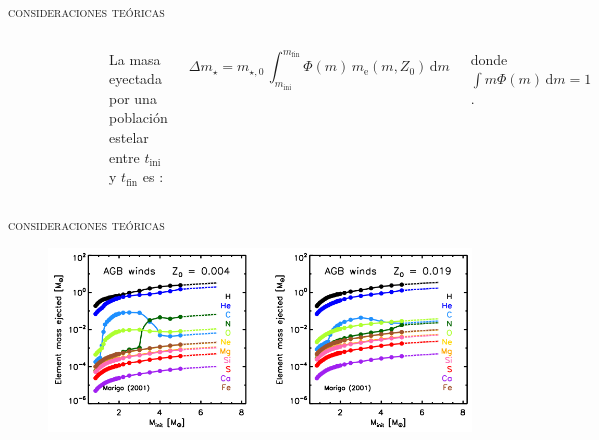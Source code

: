\documentclass[xcolor=dvipsnames,4pt,hyperref={colorlinks,citecolor=black,linkcolor=black,urlcolor=black}]{beamer}
\begin{document}
\begin{frame}{\textsc{consideraciones teóricas}}

\begin{columns}
\begin{figure}
\includegraphics[scale=0.8]{img/yates2013-1}
\end{figure}
%
La masa eyectada por una población estelar entre $t_\text{ini}$ y $t_\text{fin}$ es
\citep{Wiersma2009b}:

$$ \Delta m_\star = m_{\star,0}\,\int_{m_\text{ini}}^{m_\text{fin}}\Phi(m)\,m_\text{e}(m,Z_0)\,\text{d}m $$

donde $\int m\Phi(m)\,\text{d}m=1$.
\end{columns}
\end{frame}

\begin{frame}{\textsc{consideraciones teóricas}}

\begin{figure}
\includegraphics[scale=1]{img/yates2013-2}
\end{figure}
\end{frame}
\end{document}
